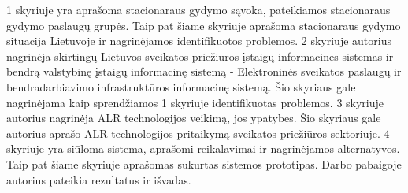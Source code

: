 1 skyriuje yra aprašoma stacionaraus gydymo sąvoka, pateikiamos stacionaraus gydymo paslaugų grupės. Taip pat šiame skyriuje aprašoma stacionaraus gydymo situacija Lietuvoje ir nagrinėjamos identifikuotos problemos. 2 skyriuje autorius nagrinėja skirtingų Lietuvos sveikatos priežiūros įstaigų informacines sistemas ir bendrą valstybinę įstaigų informacinę sistemą - Elektroninės sveikatos paslaugų ir bendradarbiavimo infrastruktūros informacinę sistemą. Šio skyriaus gale nagrinėjama kaip sprendžiamos 1 skyriuje identifikuotas problemos. 3 skyriuje autorius nagrinėja ALR technologijos veikimą, jos ypatybes. Šio skyriaus gale autorius aprašo ALR technologijos pritaikymą sveikatos priežiūros sektoriuje. 4 skyriuje yra siūloma sistema, aprašomi reikalavimai ir nagrinėjamos alternatyvos. Taip pat šiame skyriuje aprašomas sukurtas sistemos prototipas. Darbo pabaigoje autorius pateikia rezultatus ir išvadas.





